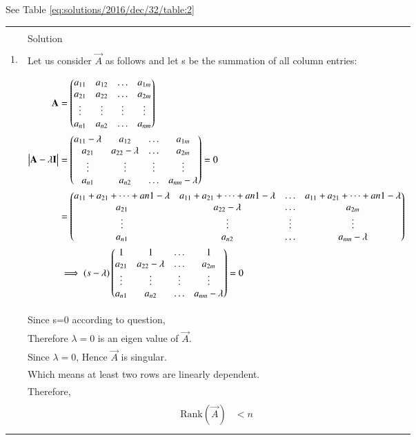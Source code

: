 See Table \ref{eq:solutions/2016/dec/32/table:2}


\onecolumn
\begin{longtable}{|l|l|}
\hline
\multirow{3}{*}{} & \\
option&Solution\\
\hline
&\\
1.&Let us consider $\vec{A}$ as follows and let s be the summation of all column entries:\\
&\parbox{6cm}{\begin{align*}
    \mathbf{A}&=\begin{pmatrix}a_{11}&a_{12}&\dots&a_{1m}\\a_{21}&a_{22}&\dots&a_{2m}\\\vdots&\vdots&\vdots&\vdots\\a_{n1}&a_{n2}&\dots&a_{nm}\end{pmatrix}\\
    \begin{vmatrix}\mathbf{A}-\lambda\mathbf{I}\end{vmatrix}&=\begin{pmatrix}a_{11}-\lambda&a_{12}&\dots&a_{1m}\\a_{21}&a_{22}-\lambda&\dots&a_{2m}\\\vdots&\vdots&\vdots&\vdots\\a_{n1}&a_{n2}&\dots&a_{nm}-\lambda\end{pmatrix}=0\\
    &=\begin{pmatrix}a_{11}+a_{21}+\dots+a{n1}-\lambda&a_{11}+a_{21}+\dots+a{n1}-\lambda&\dots&a_{11}+a_{21}+\dots+a{n1}-\lambda\\
    a_{21}&a_{22}-\lambda&\dots&a_{2m}\\\vdots&\vdots&\vdots&\vdots\\a_{n1}&a_{n2}&\dots&a_{nm}-\lambda\end{pmatrix}\\
    &\implies (s-\lambda)\begin{pmatrix}1&1&\dots&1\\a_{21}&a_{22}-\lambda&\dots&a_{2m}\\\vdots&\vdots&\vdots&\vdots\\a_{n1}&a_{n2}&\dots&a_{nm}-\lambda\end{pmatrix}=0\\
\end{align*}}\\
\hline
&\\
& Since s=0 according to question,\\
&Therefore $\lambda=0$ is an eigen value of $\vec{A}$.\\
&Since $\lambda=0$, Hence $\vec{A}$ is singular.\\
&Which means at least two rows are linearly dependent.\\
&Therefore,\\
&\parbox{6cm}{\begin{align*}
    \mbox{Rank}(\vec{A}) &< n\\

\end{align*}}
\end{longtable}
